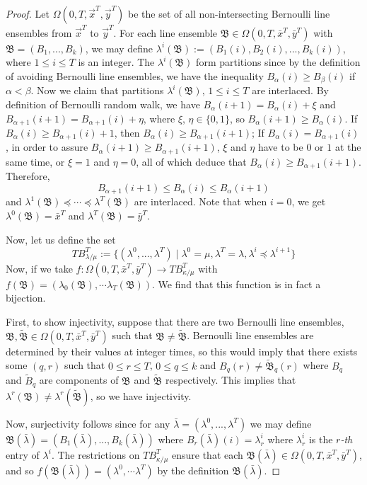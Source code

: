 \begin{proof} Let $\Omega(0,T,\vec{x}^T, \vec{y}^T)$ be the set of all non-intersecting Bernoulli line ensembles from $\vec{x}^T$ to $\vec{y}^T$. For each line ensemble $\mathfrak{B}\in \Omega(0,T,\bar x^T,\bar y^T)$ with $\mathfrak B=(B_1,...,B_k)$, we may define $\lambda^{i}(\mathfrak B):=(B_1(i),B_2(i),...,B_k(i))$, where $1 \leq i\leq T$ is an integer. The $\lambda^{i}(\mathfrak{B})$ form partitions since by the definition of avoiding Bernoulli line ensembles, we have the inequality $B_\alpha(i)\geq B_\beta(i)$ if $\alpha<\beta$. Now we claim that partitions $\lambda^{i}(\mathfrak{B})$, $1\leq i \leq T$ are interlaced. By definition of Bernoulli random walk, we have $B_{\alpha}(i+1)=B_{\alpha}(i)+\xi$ and $B_{\alpha+1}(i+1)=B_{\alpha+1}(i)+\eta$, where $\xi$, $\eta\in\{0,1\}$, so $B_{\alpha}(i+1)\geq B_{\alpha}(i)$. If $B_{\alpha}(i)\geq B_{\alpha+1}(i)+1$, then $B_{\alpha}(i)\geq B_{\alpha+1}(i+1)$; If $B_{\alpha}(i)=B_{\alpha+1}(i)$, in order to assure $B_{\alpha}(i+1)\geq B_{\alpha+1}(i+1)$, $\xi$ and $\eta$ have to be $0$ or $1$ at the same time, or $\xi=1$ and $\eta=0$, all of which deduce that $B_{\alpha}(i)\geq B_{\alpha+1}(i+1)$. Therefore,
\[B_{\alpha+1}(i+1)\leq B_\alpha(i)\leq B_\alpha(i+1)\]
and $\lambda^{1}(\mathfrak{B})\preceq\cdots\preceq\lambda^{T}(\mathfrak{B})$ are interlaced. Note that when $i=0$, we get $\lambda^0(\mathfrak{B})=\bar x^T$ and $\lambda^T(\mathfrak{B})=\bar y^T$.

Now, let us define the set 
\[TB_{\lambda/\mu}^T:=\{(\lambda^0,...,\lambda^T)\mid \lambda^0=\mu, \lambda^T=\lambda, \lambda^i\preceq\lambda^{i+1}\}\] 
Now, if we take $f:\Omega(0,T,\bar x^T, \bar y ^T)\to TB_{\kappa/\mu}^T$ with $f(\mathfrak{B})= (\lambda_0(\mathfrak{B}),\cdots \lambda_T(\mathfrak{B}))$. We find that this function is in fact a bijection. 

First, to show injectivity, suppose that there are two Bernoulli line ensembles, $\mathfrak{B}, \widetilde{\mathfrak{B}}\in \Omega(0,T,\bar x^T, \bar y ^T)$ such that $\mathfrak{B}\neq \widetilde{\mathfrak{B}}$.
Bernoulli line ensembles are determined by their values at integer times, so this would imply that there exists some $(q,r)$ such that $0\leq r\leq T$, $0\leq q \leq k$ and $B_q(r)\neq \widetilde{\mathfrak{B}}_q(r)$ where $B_q$ and $\widetilde{B}_q$ are components of $\mathfrak{B}$ and $\widetilde{\mathfrak{B}}$ respectively. 
This implies that $\lambda^r(\mathfrak B)\neq \lambda^r(\widetilde{\mathfrak{B}})$, so we have injectivity. 

Now, surjectivity follows since for any $\bar\lambda=(\lambda^0,...,\lambda^T)$ we may define $\mathfrak{B}(\bar{\lambda})=(B_1(\bar\lambda),...,B_k(\bar\lambda))$ where $B_r(\bar\lambda)(i)=\lambda^i_r$ where $\lambda^i_r$ is the $r$\textit{-th} entry of $\lambda^i$. The restrictions on $TB_{\kappa/\mu}^T$ ensure that each $\mathfrak{B}(\bar\lambda)\in \Omega(0,T,\bar x^T,\bar y^T)$, and so $f(\mathfrak B(\bar{\lambda}))=(\lambda^0,\cdots \lambda^T)$ by the definition $\mathfrak{B}(\bar\lambda)$. 


\end{proof}
